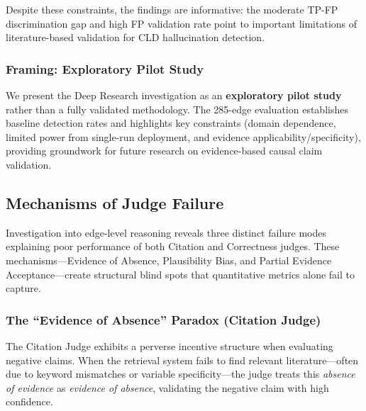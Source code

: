 Despite these constraints, the findings are informative: the moderate TP-FP discrimination gap and high FP validation rate point to important limitations of literature-based validation for CLD hallucination detection.

\subsubsection{Framing: Exploratory Pilot Study}

We present the Deep Research investigation as an \textbf{exploratory pilot study} rather than a fully validated methodology. The 285-edge evaluation establishes baseline detection rates and highlights key constraints (domain dependence, limited power from single-run deployment, and evidence applicability/specificity), providing groundwork for future research on evidence-based causal claim validation.

\subsection{Mechanisms of Judge Failure}
\label{sec:discussion_failure_mechanisms}

Investigation into edge-level reasoning reveals three distinct failure modes explaining poor performance of both Citation and Correctness judges. These mechanisms---Evidence of Absence, Plausibility Bias, and Partial Evidence Acceptance---create structural blind spots that quantitative metrics alone fail to capture.

\subsubsection{The ``Evidence of Absence'' Paradox (Citation Judge)}

The Citation Judge exhibits a perverse incentive structure when evaluating negative claims. When the retrieval system fails to find relevant literature---often due to keyword mismatches or variable specificity---the judge treats this \textit{absence of evidence} as \textit{evidence of absence}, validating the negative claim with high confidence.

